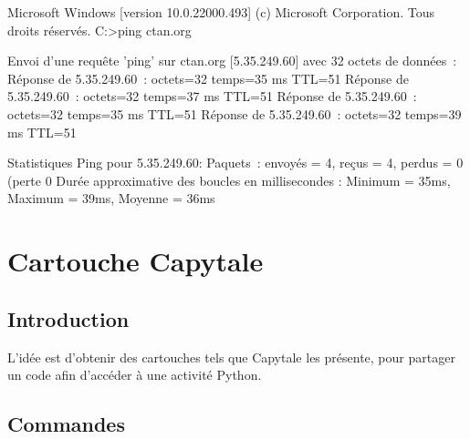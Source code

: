 \documentclass[a4paper,french,11pt]{article}
\begin{document}
\begin{codesortie}
\begin{TerminalWin}[15cm]{}
Microsoft Windows [version 10.0.22000.493]
(c) Microsoft Corporation. Tous droits réservés.
C:\Users\test>ping ctan.org

Envoi d'une requête 'ping' sur ctan.org [5.35.249.60] avec 32 octets de données :
Réponse de 5.35.249.60 : octets=32 temps=35 ms TTL=51
Réponse de 5.35.249.60 : octets=32 temps=37 ms TTL=51
Réponse de 5.35.249.60 : octets=32 temps=35 ms TTL=51
Réponse de 5.35.249.60 : octets=32 temps=39 ms TTL=51

Statistiques Ping pour 5.35.249.60:
Paquets : envoyés = 4, reçus = 4, perdus = 0 (perte 0%
Durée approximative des boucles en millisecondes :
Minimum = 35ms, Maximum = 39ms, Moyenne = 36ms
\end{TerminalWin}


\end{codesortie}

\newpage

\section{Cartouche Capytale}\label{capytale}

\subsection{Introduction}

\begin{codeidee}
L'idée est d'obtenir des \textsf{cartouches} tels que \textsf{Capytale} les présente, pour partager un code afin d'accéder à une activité \textsf{Python}.
\end{codeidee}

\subsection{Commandes}
\end{document}
